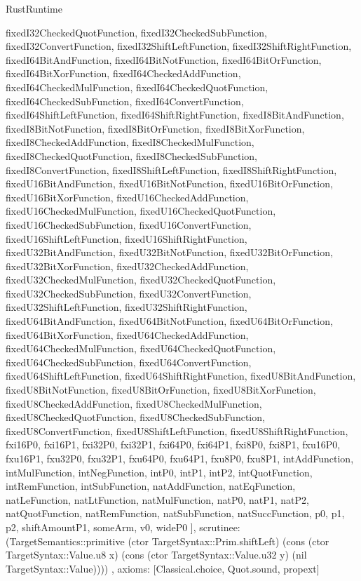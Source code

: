 \begin{lexlean}{RustRuntime}
\begin{semanticmodule}
{{      fixedI32CheckedQuotFunction,
      fixedI32CheckedSubFunction,
      fixedI32ConvertFunction,
      fixedI32ShiftLeftFunction,
      fixedI32ShiftRightFunction,
      fixedI64BitAndFunction,
      fixedI64BitNotFunction,
      fixedI64BitOrFunction,
      fixedI64BitXorFunction,
      fixedI64CheckedAddFunction,
      fixedI64CheckedMulFunction,
      fixedI64CheckedQuotFunction,
      fixedI64CheckedSubFunction,
      fixedI64ConvertFunction,
      fixedI64ShiftLeftFunction,
      fixedI64ShiftRightFunction,
      fixedI8BitAndFunction,
      fixedI8BitNotFunction,
      fixedI8BitOrFunction,
      fixedI8BitXorFunction,
      fixedI8CheckedAddFunction,
      fixedI8CheckedMulFunction,
      fixedI8CheckedQuotFunction,
      fixedI8CheckedSubFunction,
      fixedI8ConvertFunction,
      fixedI8ShiftLeftFunction,
      fixedI8ShiftRightFunction,
      fixedU16BitAndFunction,
      fixedU16BitNotFunction,
      fixedU16BitOrFunction,
      fixedU16BitXorFunction,
      fixedU16CheckedAddFunction,
      fixedU16CheckedMulFunction,
      fixedU16CheckedQuotFunction,
      fixedU16CheckedSubFunction,
      fixedU16ConvertFunction,
      fixedU16ShiftLeftFunction,
      fixedU16ShiftRightFunction,
      fixedU32BitAndFunction,
      fixedU32BitNotFunction,
      fixedU32BitOrFunction,
      fixedU32BitXorFunction,
      fixedU32CheckedAddFunction,
      fixedU32CheckedMulFunction,
      fixedU32CheckedQuotFunction,
      fixedU32CheckedSubFunction,
      fixedU32ConvertFunction,
      fixedU32ShiftLeftFunction,
      fixedU32ShiftRightFunction,
      fixedU64BitAndFunction,
      fixedU64BitNotFunction,
      fixedU64BitOrFunction,
      fixedU64BitXorFunction,
      fixedU64CheckedAddFunction,
      fixedU64CheckedMulFunction,
      fixedU64CheckedQuotFunction,
      fixedU64CheckedSubFunction,
      fixedU64ConvertFunction,
      fixedU64ShiftLeftFunction,
      fixedU64ShiftRightFunction,
      fixedU8BitAndFunction,
      fixedU8BitNotFunction,
      fixedU8BitOrFunction,
      fixedU8BitXorFunction,
      fixedU8CheckedAddFunction,
      fixedU8CheckedMulFunction,
      fixedU8CheckedQuotFunction,
      fixedU8CheckedSubFunction,
      fixedU8ConvertFunction,
      fixedU8ShiftLeftFunction,
      fixedU8ShiftRightFunction,
      fxi16P0,
      fxi16P1,
      fxi32P0,
      fxi32P1,
      fxi64P0,
      fxi64P1,
      fxi8P0,
      fxi8P1,
      fxu16P0,
      fxu16P1,
      fxu32P0,
      fxu32P1,
      fxu64P0,
      fxu64P1,
      fxu8P0,
      fxu8P1,
      intAddFunction,
      intMulFunction,
      intNegFunction,
      intP0,
      intP1,
      intP2,
      intQuotFunction,
      intRemFunction,
      intSubFunction,
      natAddFunction,
      natEqFunction,
      natLeFunction,
      natLtFunction,
      natMulFunction,
      natP0,
      natP1,
      natP2,
      natQuotFunction,
      natRemFunction,
      natSubFunction,
      natSuccFunction,
      p0,
      p1,
      p2,
      shiftAmountP1,
      someArm,
      v0,
      wideP0
    ],
    scrutinee: (TargetSemantics::primitive (ctor TargetSyntax::Prim.shiftLeft) (cons (ctor TargetSyntax::Value.u8 x) (cons (ctor TargetSyntax::Value.u32 y) (nil TargetSyntax::Value))))
  },
  axioms: [Classical.choice, Quot.sound, propext]
}


\end{semanticmodule}
\end{lexlean}

